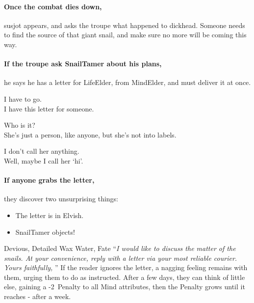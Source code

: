 \paragraph{Once the combat dies down,}
\gls{susjot} appears, and asks the troupe what happened to \gls{dickhead}.
Someone needs to find the source of that giant snail, and make sure no more will be coming this way.

\paragraph{If the troupe ask \gls{SnailTamer} about his plans,}
he says he has a letter for \gls{LifeElder}, from \gls{MindElder}, and must deliver it at once.

\begin{speechtext}
  I have to go. \\
  I have this letter for someone.

  Who is it? \\
  She's just a person, like anyone, but she's not into labels.

  I don't call her anything. \\
  Well, maybe I call her `hi'.
\end{speechtext}

\paragraph{If anyone grabs the letter,}
they discover two unsurprising things:

\begin{itemize}
  \item
  The letter is in Elvish.
  \item
  \Gls{SnailTamer} objects!
\end{itemize}

  {Devious, Detailed}%
  {Wax}%
  {Water, Fate}%
  {}%
  {``\textit{I would like to discuss the matter of the snails.
  At your convenience, reply with a letter via your most reliable courier.  Yours faithfully, }''}%
  {If the reader ignores the letter, a nagging feeling remains with them, urging them to do as instructed.
  After a few days, they can think of little else, gaining a -2~Penalty to all Mind \glspl{attribute}, then the Penalty grows until it  reaches - after a week.}%


\showTalisman

